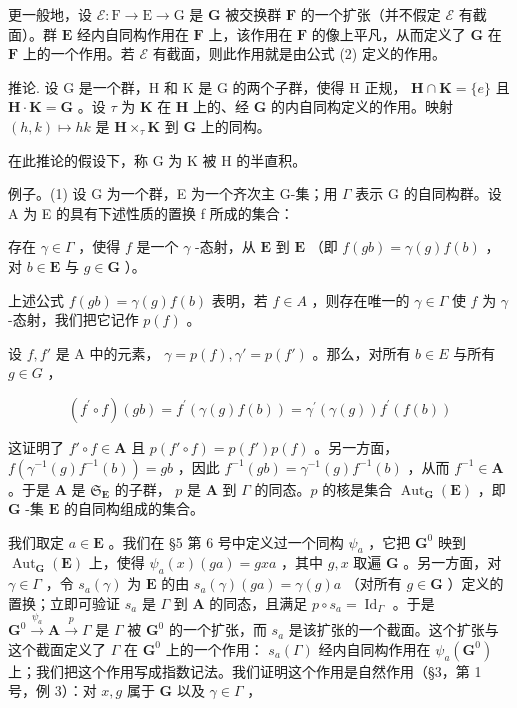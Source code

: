 更一般地，设 \(\mathcal{E}:\mathrm{F}\to \mathrm{E}\to \mathrm{G}\) 是 \(\mathbf{G}\) 被交换群 \(\mathbf{F}\) 的一个扩张（并不假定 \(\mathcal{E}\) 有截面）。群 \(\mathbf{E}\) 经内自同构作用在 \(\mathbf{F}\) 上，该作用在 \(\mathbf{F}\) 的像上平凡，从而定义了 \(\mathbf{G}\) 在 \(\mathbf{F}\) 上的一个作用。若 \(\mathcal{E}\) 有截面，则此作用就是由公式 (2) 定义的作用。

推论. 设 G 是一个群，H 和 K 是 G 的两个子群，使得 H 正规， \(\mathbf{H} \cap \mathbf{K} = \{e\}\) 且 \(\mathbf{H} \cdot \mathbf{K} = \mathbf{G}\) 。设 \(\tau\) 为 \(\mathbf{K}\) 在 \(\mathbf{H}\) 上的、经 \(\mathbf{G}\) 的内自同构定义的作用。映射 \((h, k) \mapsto hk\) 是 \(\mathbf{H} \times_{\tau} \mathbf{K}\) 到 \(\mathbf{G}\) 上的同构。

在此推论的假设下，称 G 为 K 被 H 的半直积。

例子。(1) 设 G 为一个群，E 为一个齐次主 G-集；用 \(\Gamma\) 表示 G 的自同构群。设 A 为 E 的具有下述性质的置换 f 所成的集合：

存在 \(\gamma \in \Gamma\) ，使得 \(f\) 是一个 \(\gamma\) -态射，从 \(\mathbf{E}\) 到 \(\mathbf{E}\) （即 \(f(gb) = \gamma(g)f(b)\) ，对 \(b \in \mathbf{E}\) 与 \(g \in \mathbf{G}\) ）。

上述公式 \(f(gb) = \gamma(g)f(b)\) 表明，若 \(f \in A\) ，则存在唯一的 \(\gamma \in \Gamma\) 使 \(f\) 为 \(\gamma\) -态射，我们把它记作 \(p(f)\) 。

设 \(f, f'\) 是 A 中的元素， \(\gamma = p(f), \gamma' = p(f')\) 。那么，对所有 \(b \in E\) 与所有 \(g \in G\) ，

\[
(f ^ {\prime} \circ f) (g b) = f ^ {\prime} (\gamma (g) f (b)) = \gamma^ {\prime} (\gamma (g)) f ^ {\prime} (f (b))
\]

这证明了 \(f' \circ f \in \mathbf{A}\) 且 \(p(f' \circ f) = p(f')p(f)\) 。另一方面， \(f(\gamma^{-1}(g)f^{-1}(b)) = gb\) ，因此 \(f^{-1}(gb) = \gamma^{-1}(g)f^{-1}(b)\) ，从而 \(f^{-1} \in \mathbf{A}\) 。于是 \(\mathbf{A}\) 是 \(\mathfrak{S}_{\mathbf{E}}\) 的子群， \(p\) 是 \(\mathbf{A}\) 到 \(\Gamma\) 的同态。\(p\) 的核是集合 \(\operatorname{Aut}_{\mathbf{G}}(\mathbf{E})\) ，即 \(\mathbf{G}\) -集 \(\mathbf{E}\) 的自同构组成的集合。

我们取定 \(a \in \mathbf{E}\) 。我们在 §5 第 6 号中定义过一个同构 \(\psi_a\) ，它把 \(\mathbf{G}^0\) 映到 \(\operatorname{Aut}_{\mathbf{G}}(\mathbf{E})\) 上，使得 \(\psi_a(x)(ga) = gxa\) ，其中 \(g, x\) 取遍 \(\mathbf{G}\) 。另一方面，对 \(\gamma \in \Gamma\) ，令 \(s_a(\gamma)\) 为 \(\mathbf{E}\) 的由 \(s_a(\gamma)(ga) = \gamma(g)a\) （对所有 \(g \in \mathbf{G}\) ）定义的置换；立即可验证 \(s_a\) 是 \(\Gamma\) 到 \(\mathbf{A}\) 的同态，且满足 \(p \circ s_a = \operatorname{Id}_{\Gamma}\) 。于是 \(\mathbf{G}^0 \xrightarrow{\psi_a} \mathbf{A} \xrightarrow{p} \Gamma\) 是 \(\Gamma\) 被 \(\mathbf{G}^0\) 的一个扩张，而 \(s_a\) 是该扩张的一个截面。这个扩张与这个截面定义了 \(\Gamma\) 在 \(\mathbf{G}^0\) 上的一个作用： \(s_a(\Gamma)\) 经内自同构作用在 \(\psi_a(\mathbf{G}^0)\) 上；我们把这个作用写成指数记法。我们证明这个作用是自然作用（§3，第 1 号，例 3）：对 \(x, g\) 属于 \(\mathbf{G}\) 以及 \(\gamma \in \Gamma\) ，

